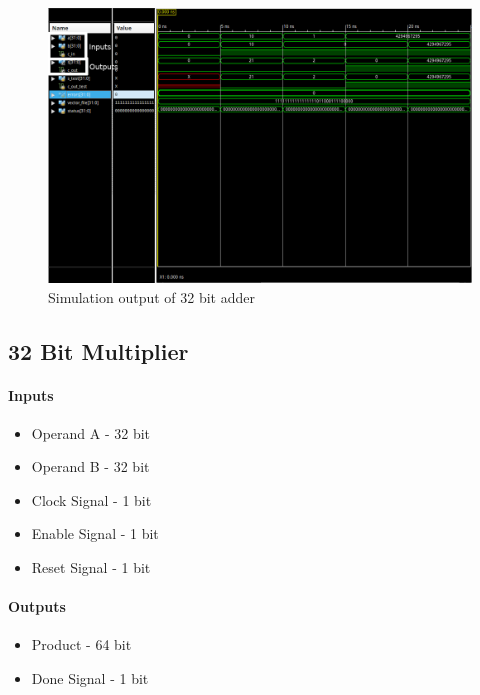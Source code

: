 \documentclass{article}
\begin{document}
    \begin{figure}[H]
        \centering
        \includegraphics[width=0.9\paperwidth,center]{Screenshots/adder_32.png}
        \caption{Simulation output of 32 bit adder}
    \end{figure}



    \subsection{32 Bit Multiplier}

    \paragraph{Inputs}
    \begin{itemize}
        \item Operand A - 32 bit
        \item Operand B - 32 bit
        \item Clock Signal - 1 bit
        \item Enable Signal - 1 bit
        \item Reset Signal - 1 bit
    \end{itemize}

    \paragraph{Outputs}
    \begin{itemize}
        \item Product - 64 bit
        \item Done Signal - 1 bit
    \end{itemize}
\end{document}
